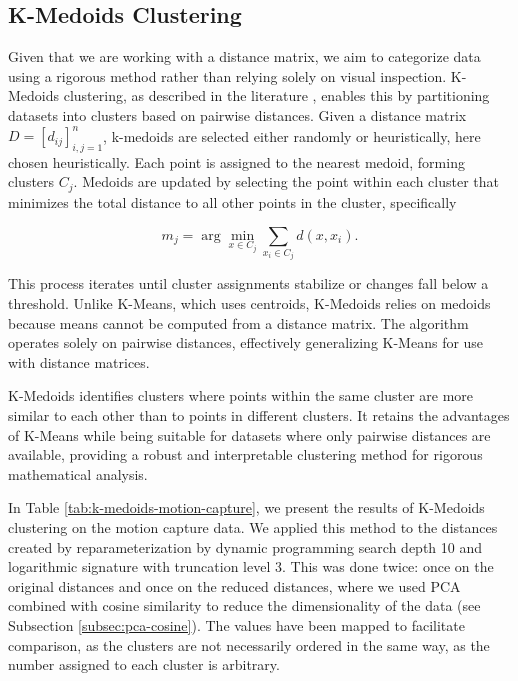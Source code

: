 \subsection{K-Medoids Clustering}
\label{subsec:kmedoids-clustering}

Given that we are working with a distance matrix, we aim to categorize data using a rigorous method rather than relying solely on visual inspection. K-Medoids clustering, as described in the literature \cite{kaufmannClusteringMeansMedoids1987, schubertFastEagerKMedoids2021}, enables this by partitioning datasets into clusters based on pairwise distances. Given a distance matrix \( D = [d_{ij}]_{i,j=1}^{n} \), k-medoids are selected either randomly or heuristically, here chosen heuristically. Each point is assigned to the nearest medoid, forming clusters \( C_j \). Medoids are updated by selecting the point within each cluster that minimizes the total distance to all other points in the cluster, specifically

\begin{equation}
    m_j = \arg \min_{x \in C_j} \sum_{x_i \in C_j} d(x, x_i).
    \label{eq:k-medoids-update}
\end{equation}

This process iterates until cluster assignments stabilize or changes fall below a threshold. Unlike K-Means, which uses centroids, K-Medoids relies on medoids because means cannot be computed from a distance matrix. The algorithm operates solely on pairwise distances, effectively generalizing K-Means for use with distance matrices.

K-Medoids identifies clusters where points within the same cluster are more similar to each other than to points in different clusters. It retains the advantages of K-Means while being suitable for datasets where only pairwise distances are available, providing a robust and interpretable clustering method for rigorous mathematical analysis.

In Table \ref{tab:k-medoids-motion-capture}, we present the results of K-Medoids clustering on the motion capture data. We applied this method to the distances created by reparameterization by dynamic programming search depth 10 and logarithmic signature with truncation level 3. This was done twice: once on the original distances and once on the reduced distances, where we used PCA combined with cosine similarity to reduce the dimensionality of the data (see Subsection \ref{subsec:pca-cosine}). The values have been mapped to facilitate comparison, as the clusters are not necessarily ordered in the same way, as the number assigned to each cluster is arbitrary.

